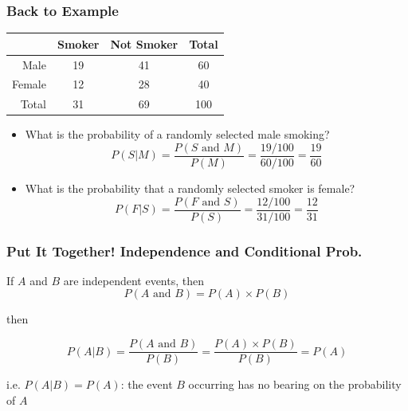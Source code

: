\documentclass[slides]{beamer}
\begin{document}
\begin{frame}
\frametitle{Back to Example}
\begin{center}
  \begin{tabular}{r|cc|c}
	&Smoker&Not Smoker&Total\\
	\hline
Male&19&41&60\\
Female&12&28&40\\
\hline
Total&31&69&100\\
\end{tabular}
\end{center}

\begin{small}
\begin{itemize}
\item What is the probability of a randomly selected male smoking?
\[
P(S|M) = \frac{P(S \mbox{ and } M)}{P(M)} = \frac{19/100}{60/100} = \frac{19}{60}
\]
\item What is the probability that a randomly selected smoker is female?
\[
P(F|S) = \frac{P(F \mbox{ and } S)}{P(S)} = \frac{12/100}{31/100} = \frac{12}{31}
\]
\end{itemize}
\end{small}

\end{frame}


\begin{frame}
\frametitle{Put It Together!  Independence and Conditional Prob.}
If $A$ and $B$ are independent events, then
\[
P(A \mbox{ and } B) = P(A)\times P(B)
\]

\pause then

\[
P(A|B) = \frac{P(A \mbox{ and } B)}{P(B)} = \frac{P(A)\times P(B)}{P(B)} = P(A)
\]  

\vspace{0.5cm}

\pause i.e. $P(A|B) = P(A)$: the event $B$ occurring has no bearing on the probability of $A$

\end{frame}
\end{document}
